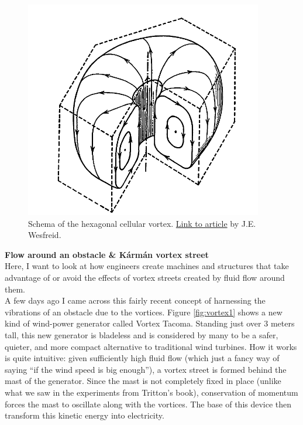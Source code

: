 \documentclass[11pt]{article}
\begin{document}
\begin{figure}[!htb]
	\centering
	\includegraphics[scale=0.7]{RB-convec3}
	\caption{Schema of the hexagonal cellular vortex. \href{https://doi.org/10.1016/j.crme.2017.06.006}{Link to article} by J.E. Wesfreid.}
\end{figure}



\noindent \textbf{Flow around an obstacle \& K\'{a}rm\'{a}n vortex street}\\

\noindent Here, I want to look at how engineers create machines and structures that take advantage of or avoid the effects of vortex streets created by fluid flow around them. \\

A few days ago I came across this fairly recent concept of harnessing the vibrations of an obstacle due to the vortices. Figure \ref{fig:vortex1} shows a new kind of wind-power generator called Vortex Tacoma. Standing just over 3 meters tall, this new generator is bladeless and is considered by many to be a safer, quieter, and more compact alternative to traditional wind turbines. How it works is quite intuitive: given sufficiently high fluid flow (which just a fancy way of saying ``if the wind speed is big enough''), a vortex street is formed behind the mast of the generator. Since the mast is not completely fixed in place (unlike what we saw in the experiments from Tritton's book), conservation of momentum forces the mast to oscillate along with the vortices. The base of this device then transform this kinetic energy into electricity. \\
\end{document}
